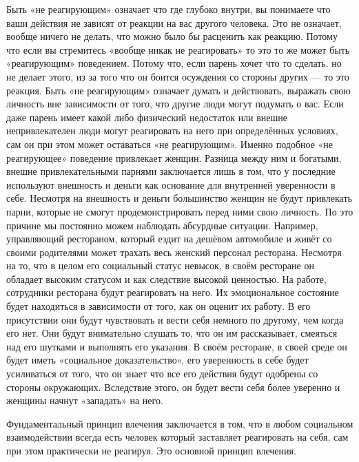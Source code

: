 Быть «не реагирующим» означает что где глубоко внутри, вы понимаете что ваши действия не зависят от реакции на вас другого человека. Это не означает, вообще ничего не делать, что можно было бы расценить как реакцию. Потому что если вы стремитесь «вообще никак не реагировать» то это то же может быть «реагирующим» поведением. Потому что, если парень хочет что то сделать. но не делает этого, из за того что он боится осуждения со стороны других --- то это реакция. Быть «не реагирующим» означает думать и действовать, выражать свою личность вне зависимости от того, что другие люди могут подумать о вас. Если даже парень имеет какой либо физический недостаток или внешне непривлекателен люди могут реагировать на него при определённых условиях, сам он при этом может оставаться «не реагирующим». Именно подобное «не реагирующее» поведение привлекает женщин. Разница между ним и богатыми, внешне привлекательными парнями заключается лишь в том, что у последние используют внешность и деньги как основание для внутренней уверенности в себе. Несмотря на внешность и деньги большинство женщин не будут привлекать парни, которые не смогут продемонстрировать перед ними свою личность. По это причине мы постоянно можем наблюдать абсурдные ситуации. Например, управляющий рестораном, который ездит на дешёвом автомобиле и живёт со своими родителями может трахать весь женский персонал ресторана. Несмотря на то, что в целом его социальный статус невысок, в своём ресторане он обладает высоким статусом и как следствие высокой ценностью. На работе, сотрудники ресторана будут реагировать на него. Их эмоциональное состояние будет находиться в зависимости от того, как он оценит их работу. В его присутствии они будут чувствовать и вести себя немного по другому, чем когда его нет. Они будут внимательно слушать то, что он им рассказывает, смеяться над его шутками и выполнять его указания. В своём ресторане, в своей среде он будет иметь «социальное доказательство», его уверенность в себе будет усиливаться от того, что он знает что все его действия будут одобрены со стороны окружающих. Вследствие этого, он будет вести себя более уверенно и женщины начнут «западать» на него.

\RULE  Фундаментальный принцип влечения заключается в том, что в любом социальном взаимодействии всегда есть человек который заставляет реагировать на себя, сам при этом практически не реагируя. Это основной принцип влечения.

